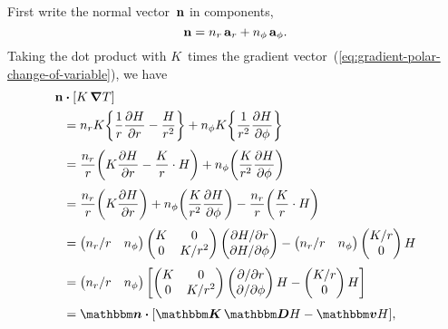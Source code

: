First write the normal vector~$\mathop{}\!\boldsymbol{\mathbf{n}}$ in components,
\begin{equation}
  \mathop{}\!\boldsymbol{\mathbf{n}} = n_r \mathop{}\!\boldsymbol{\mathbf{a}}_{r} + n_\phi \mathop{}\!\boldsymbol{\mathbf{a}}_{\phi}.
  \label{eq:normal-vector-polar}
\end{equation}
Taking the dot product with
$K$~times the gradient vector~(\ref{eq:gradient-polar-change-of-variable}),
we have
\begin{align*}
  \normalvec & \dotp \squarebr{K \del T} \\
  &=
    n_r K \curlybr*{\frac{1}{r} \pder{H}{r} - \frac{H}{r^2}}
      +
    n_\phi K \curlybr*{\frac{1}{r^2} \pder{H}{\phi}}
    \\[\tallspace]
  &=
    \frac{n_r}{r} \roundbr*{K \pder{H}{r} - \frac{K}{r} \cdot H}
      +
    n_\phi \roundbr*{\frac{K}{r^2} \pder{H}{\phi}}
    \\[\tallspace]
  &=
    \frac{n_r}{r} \roundbr*{K \pder{H}{r}}
      +
    n_\phi \roundbr*{\frac{K}{r^2} \pder{H}{\phi}}
      -
    \frac{n_r}{r} \roundbr*{\frac{K}{r} \cdot H}
    \\[\tallspace]
  &=
    \begin{pmatrix}
      n_r / r  &  n_\phi
    \end{pmatrix}
    \begin{pmatrix}
      K  &  0 \\
      0  &  K / r^2
    \end{pmatrix}
    \begin{pmatrix}
      \pd H / {\pd r} \\
      \pd H / {\pd\phi}
    \end{pmatrix}
      -
    \begin{pmatrix}
      n_r / r  &  n_\phi
    \end{pmatrix}
    \begin{pmatrix}
      K / r \\
      0
    \end{pmatrix}
    H
    \\[\tallspace]
  &=
    \begin{pmatrix}
      n_r / r  &  n_\phi
    \end{pmatrix}
    \squarebr*{
      \begin{pmatrix}
        K  &  0 \\
        0  &  K / r^2
      \end{pmatrix}
      \begin{pmatrix}
        \pd / {\pd r} \\
        \pd / {\pd\phi}
      \end{pmatrix}
      H
        -
      \begin{pmatrix}
        K / r \\
        0
      \end{pmatrix}
      H
    }
    \\[\tallspace]
  &=
    \mat{n} \dotp \squarebr[\bulkysize]{\mat{K} \matder H - \mat{v} H},
\end{align*}
